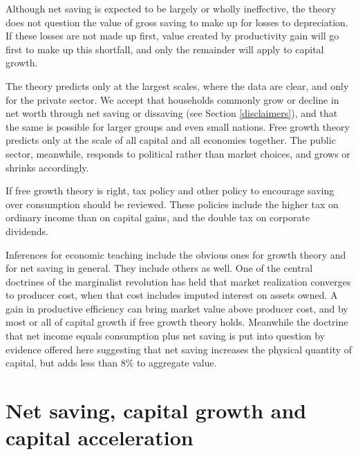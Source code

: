 \documentclass[a4padisinvitingper,fleqn]{latex_styles/cas-sc}
\begin{document}
Although net saving is expected to be largely or wholly ineffective, the theory does not question the value of gross saving to make up for losses to depreciation. If these losses are not made up first, value created by productivity gain will go first to make up this shortfall, and only the remainder will apply to capital growth.

The theory predicts only at the largest scales, where the data are clear, and only for the private sector.
We accept that households commonly grow or decline in net worth through net saving or dissaving (see Section \ref{disclaimers}), and that the same is possible for larger groups and even small nations. Free growth theory predicts 
only at the scale of all capital and all economies together. The public sector,
meanwhile, responds to political rather than market choices, and grows
or shrinks accordingly.


If free growth theory is right, tax policy and other policy to encourage
saving over consumption should be reviewed. These policies
include the higher tax on ordinary income than on capital gains, and the
double tax on corporate dividends.

Inferences for economic teaching include the obvious ones for growth
theory and for net saving in general. They include others as well.
One of the central doctrines of the marginalist revolution has held that
market realization converges to producer cost, when that cost includes
imputed interest on assets owned.
A gain in productive efficiency can bring market value above producer cost, and by most or all of capital growth if free growth theory holds.
Meanwhile the doctrine that net income equals
consumption plus net saving is put into question by evidence offered
here suggesting that net saving increases the physical quantity of
capital, but adds less than 8\% to aggregate value. 

\hypertarget{net-saving-and-capital-growth}{%
\section{Net saving, capital growth and capital acceleration}\label{net-saving-and-capital-growth}}
\end{document}
